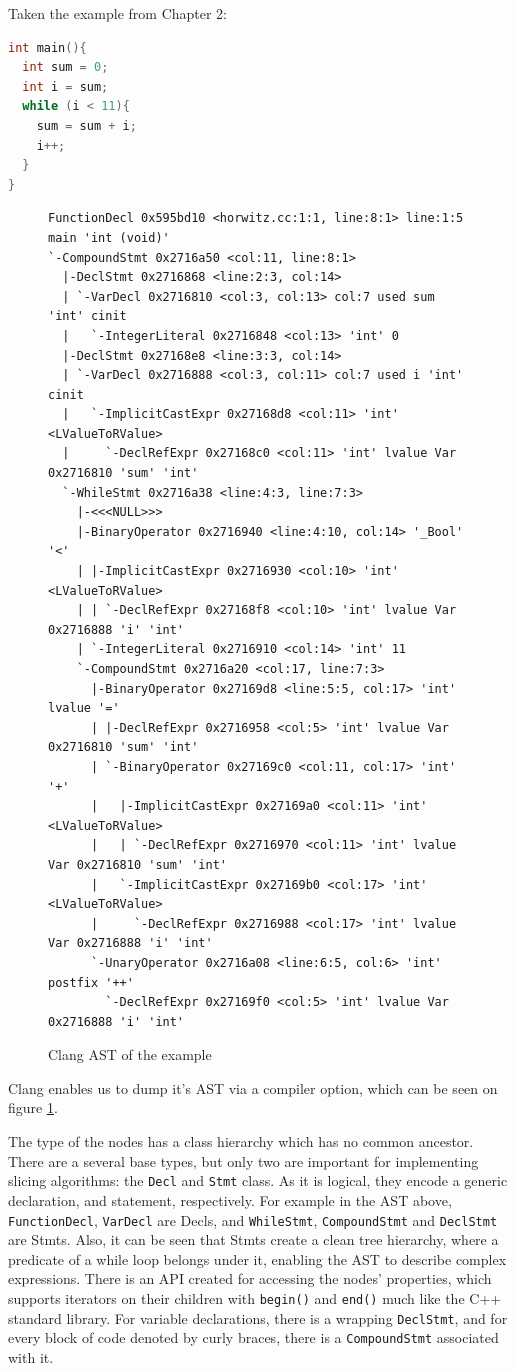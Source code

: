 \documentclass[oneside,12pt,a4paper]{book}
\begin{document}
Taken the example from Chapter 2:
\begin{lstlisting}[language=C++]
int main(){
  int sum = 0;
  int i = sum;
  while (i < 11){
    sum = sum + i;
    i++;
  }
}
\end{lstlisting}
\begin{figure}[h]
\lstset{
xleftmargin=-80pt,
aboveskip=\smallskipamount,
belowskip=\smallskipamount}
\begin{lstlisting}
FunctionDecl 0x595bd10 <horwitz.cc:1:1, line:8:1> line:1:5 main 'int (void)'
`-CompoundStmt 0x2716a50 <col:11, line:8:1>
  |-DeclStmt 0x2716868 <line:2:3, col:14>
  | `-VarDecl 0x2716810 <col:3, col:13> col:7 used sum 'int' cinit
  |   `-IntegerLiteral 0x2716848 <col:13> 'int' 0
  |-DeclStmt 0x27168e8 <line:3:3, col:14>
  | `-VarDecl 0x2716888 <col:3, col:11> col:7 used i 'int' cinit
  |   `-ImplicitCastExpr 0x27168d8 <col:11> 'int' <LValueToRValue>
  |     `-DeclRefExpr 0x27168c0 <col:11> 'int' lvalue Var 0x2716810 'sum' 'int'
  `-WhileStmt 0x2716a38 <line:4:3, line:7:3>
    |-<<<NULL>>>
    |-BinaryOperator 0x2716940 <line:4:10, col:14> '_Bool' '<'
    | |-ImplicitCastExpr 0x2716930 <col:10> 'int' <LValueToRValue>
    | | `-DeclRefExpr 0x27168f8 <col:10> 'int' lvalue Var 0x2716888 'i' 'int'
    | `-IntegerLiteral 0x2716910 <col:14> 'int' 11
    `-CompoundStmt 0x2716a20 <col:17, line:7:3>
      |-BinaryOperator 0x27169d8 <line:5:5, col:17> 'int' lvalue '='
      | |-DeclRefExpr 0x2716958 <col:5> 'int' lvalue Var 0x2716810 'sum' 'int'
      | `-BinaryOperator 0x27169c0 <col:11, col:17> 'int' '+'
      |   |-ImplicitCastExpr 0x27169a0 <col:11> 'int' <LValueToRValue>
      |   | `-DeclRefExpr 0x2716970 <col:11> 'int' lvalue Var 0x2716810 'sum' 'int'
      |   `-ImplicitCastExpr 0x27169b0 <col:17> 'int' <LValueToRValue>
      |     `-DeclRefExpr 0x2716988 <col:17> 'int' lvalue Var 0x2716888 'i' 'int'
      `-UnaryOperator 0x2716a08 <line:6:5, col:6> 'int' postfix '++'
        `-DeclRefExpr 0x27169f0 <col:5> 'int' lvalue Var 0x2716888 'i' 'int'
\end{lstlisting}
\caption{Clang AST of the example}
\label{fig:clang_ast}
\end{figure}

Clang enables us to dump it's AST via a compiler option, which can be seen on figure \ref{fig:clang_ast}.

The type of the nodes has a class hierarchy which has no common ancestor. There are a several base types, but only two are important for implementing slicing algorithms: the \texttt{Decl} and \texttt{Stmt} class. As it is logical, they encode a generic declaration, and statement, respectively. For example in the AST above, \texttt{FunctionDecl}, \texttt{VarDecl} are Decls, and \texttt{WhileStmt}, \texttt{CompoundStmt} and \texttt{DeclStmt} are Stmts. Also, it can be seen that Stmts create a clean tree hierarchy, where a predicate of a while loop belongs under it, enabling the AST to describe complex expressions. There is an API created for accessing the nodes' properties, which supports iterators on their children with \texttt{begin()} and \texttt{end()} much like the C++ standard library. For variable declarations, there is a wrapping \texttt{DeclStmt}, and for every block of code denoted by curly braces, there is a \texttt{CompoundStmt} associated with it. 
\end{document}
